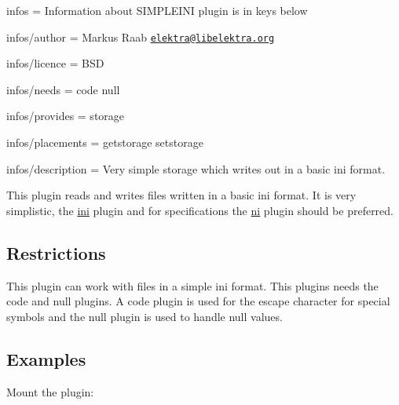 
\begin{DoxyItemize}
\item infos = Information about S\+I\+M\+P\+L\+E\+I\+N\+I plugin is in keys below
\item infos/author = Markus Raab \href{mailto:elektra@libelektra.org}{\tt elektra@libelektra.\+org}
\item infos/licence = B\+S\+D
\item infos/needs = code null
\item infos/provides = storage
\item infos/placements = getstorage setstorage
\item infos/description = Very simple storage which writes out in a basic ini format.
\end{DoxyItemize}

This plugin reads and writes files written in a basic ini format. It is very simplistic, the \hyperlink{md_src_plugins_ini_README_src_plugins_ini_README_md}{ini} plugin and for specifications the \hyperlink{md_src_plugins_ni_README_src_plugins_ni_README_md}{ni} plugin should be preferred.

\subsection*{Restrictions}

This plugin can work with files in a simple ini format. This plugins needs the code and null plugins. A code plugin is used for the escape character for special symbols and the null plugin is used to handle null values.

\subsection*{Examples}

Mount the plugin\+: 
 